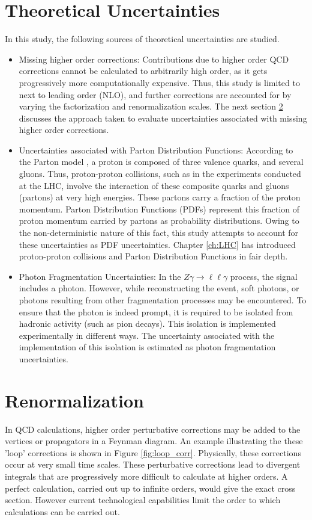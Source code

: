 \documentclass[11pt,a4paper,openright,twoside]{report}
\newcommand{\Zg}{$Z\gamma\to \ell\ell\gamma$ }
\begin{document}
\section{Theoretical Uncertainties}
In this study, the following sources of theoretical uncertainties are studied.
\begin{itemize}
\item Missing higher order corrections: Contributions due to higher order QCD corrections cannot be calculated to arbitrarily high order, as it gets progressively more computationally expensive. Thus, this study is limited to next to leading order (NLO), and further corrections are accounted for by varying the factorization and renormalization scales. The next section \ref{sec:renorm} discusses the approach taken to evaluate uncertainties associated with missing higher order corrections.

\item Uncertainties associated with Parton Distribution Functions: According to the Parton model \cite{parton_model}, a proton is composed of three valence quarks, and several gluons. Thus, proton-proton collisions, such as in the experiments conducted at the LHC, involve the interaction of these composite quarks and gluons (partons) at very high energies. These partons carry a fraction of the proton momentum. Parton Distribution Functions (PDFs) represent this fraction of proton momentum carried by partons as probability distributions. Owing to the non-deterministic nature of this fact, this study attempts to account for these uncertainties as PDF uncertainties. Chapter \ref{ch:LHC} has introduced proton-proton collisions and Parton Distribution Functions in fair depth.

\item Photon Fragmentation Uncertainties: In the \Zg process, the signal includes a photon. However, while reconstructing the event, soft photons, or photons resulting from other fragmentation processes may be encountered. To ensure that the photon is indeed prompt, it is required to be isolated from hadronic activity (such as pion decays). This isolation is implemented experimentally in different ways. The uncertainty associated with the implementation of this isolation is estimated as photon fragmentation uncertainties.
\end{itemize}

\section{Renormalization}\label{sec:renorm}
In QCD calculations, higher order perturbative corrections may be added to the vertices or propagators in a Feynman diagram. An example illustrating the these 'loop' corrections is shown in Figure \ref{fig:loop_corr}. Physically, these corrections occur at very small time scales. These perturbative corrections lead to divergent integrals that are progressively more difficult to calculate at higher orders. A perfect calculation, carried out up to infinite orders, would give the exact cross section. However current technological capabilities limit the order to which calculations can be carried out.
\end{document}
